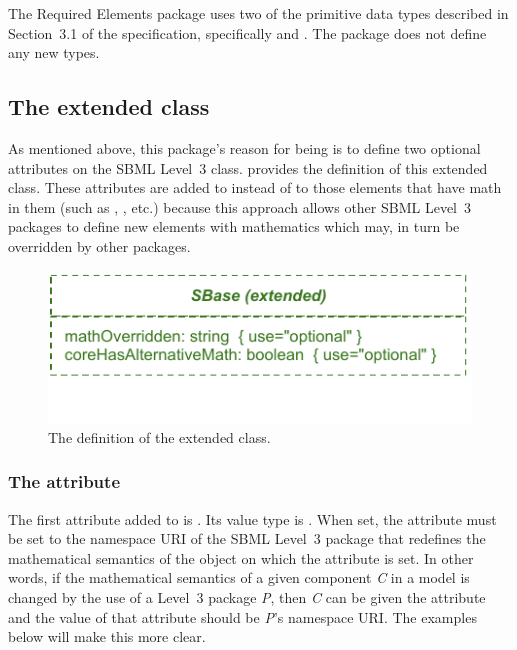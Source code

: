 The Required Elements package uses two of the primitive data types described in Section~3.1 of the \sbmlthreecore specification, specifically  and .  The package does not define any new types.


\subsection{The extended  class}
\label{extended-sbase-class}

As mentioned above, this package's reason for being is to define two optional attributes on the SBML Level~3 \SBase class.   provides the definition of this extended \SBase class.  These attributes are added to \SBase instead of to those elements that have math in them (such as \InitialAssignment, \KineticLaw, etc.) because this approach allows other SBML Level~3 packages to define new elements with mathematics which may, in turn be overridden by other packages.

\begin{figure}[bh]
  \includegraphics{figs/extended-sbase-req-uml}
  \vspace*{-3.5em}
  \caption{The definition of the extended \SBase class.}
  \label{extended-sbase-uml}
\end{figure}

\subsubsection{The \fixttspace{} attribute}
\label{attribute-mathoverridden}

The first attribute added to \SBase is .  Its value type is .  When set, the attribute must be set to the namespace URI of the SBML Level~3 package that redefines the mathematical semantics of the object on which the attribute is set.  In other words, if the mathematical semantics of a given component \emph{C} in a model is changed by the use of a Level~3 package \emph{P}, then \emph{C} can be given the attribute  and the value of that attribute should be \emph{P}'s namespace URI.  The examples below will make this more clear.

